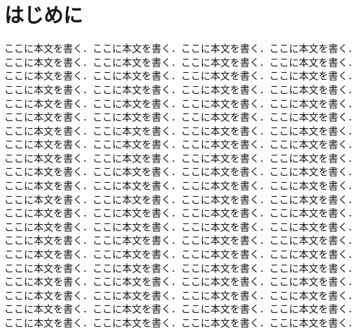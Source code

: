 \section{はじめに}
ここに本文を書く．ここに本文を書く．ここに本文を書く．ここに本文を書く．
ここに本文を書く．ここに本文を書く．ここに本文を書く．ここに本文を書く．
ここに本文を書く．ここに本文を書く．ここに本文を書く．ここに本文を書く．
ここに本文を書く．ここに本文を書く．ここに本文を書く．ここに本文を書く．
ここに本文を書く．ここに本文を書く．ここに本文を書く．ここに本文を書く．
ここに本文を書く．ここに本文を書く．ここに本文を書く．ここに本文を書く．
ここに本文を書く．ここに本文を書く．ここに本文を書く．ここに本文を書く．
ここに本文を書く．ここに本文を書く．ここに本文を書く．ここに本文を書く．
ここに本文を書く．ここに本文を書く．ここに本文を書く．ここに本文を書く．
ここに本文を書く．ここに本文を書く．ここに本文を書く．ここに本文を書く．
ここに本文を書く．ここに本文を書く．ここに本文を書く．ここに本文を書く．
ここに本文を書く．ここに本文を書く．ここに本文を書く．ここに本文を書く．
ここに本文を書く．ここに本文を書く．ここに本文を書く．ここに本文を書く．
ここに本文を書く．ここに本文を書く．ここに本文を書く．ここに本文を書く．
ここに本文を書く．ここに本文を書く．ここに本文を書く．ここに本文を書く．
ここに本文を書く．ここに本文を書く．ここに本文を書く．ここに本文を書く．
ここに本文を書く．ここに本文を書く．ここに本文を書く．ここに本文を書く．
ここに本文を書く．ここに本文を書く．ここに本文を書く．ここに本文を書く．
ここに本文を書く．ここに本文を書く．ここに本文を書く．ここに本文を書く．
ここに本文を書く．ここに本文を書く．ここに本文を書く．ここに本文を書く．
ここに本文を書く．ここに本文を書く．ここに本文を書く．ここに本文を書く．


